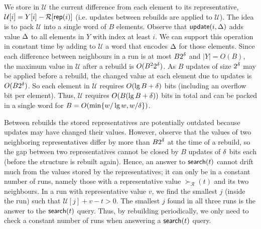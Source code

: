 We store in $\mathcal{U}$ the current difference from each element to its representative, $\mathcal{U}[i] = Y[i] - \mathcal{R}[\mathsf{rep}(i)]$ (i.e. updates between rebuilds are applied to $\mathcal{U}$). The idea is to pack $\mathcal{U}$ into a single word of $B$ elements.
Observe that $\mathsf{update}(i, \Delta)$ adds value $\Delta$ to all elements in $Y$ with index at least $i$. We can support this operation in constant time by adding to $\mathcal{U}$ a word that encodes $\Delta$ for those elements.
Since each difference between neighbours in a run is at most $B 2^\delta$ and $|Y| = O(B)$, the maximum value in $\mathcal{U}$ after a rebuild is $O(B^2 2^\delta)$. As $B$ updates of size $2^\delta$ may be applied before a rebuild, the changed value at each element due to updates is $O(B 2^\delta)$. So each element in $\mathcal{U}$ requires $O(\lg B + \delta)$ bits (including an overflow bit per element). Thus, $\mathcal{U}$ requires $O(B(\lg B + \delta))$ bits in total and can be packed in a single word for $B = O(\min \{w / \lg w, w / \delta \})$.

Between rebuilds the stored representatives are potentially outdated because updates may have changed their values. %
However, observe that the values of two neighboring representatives differ by more than $B 2^\delta$ at the time of a rebuild, so the gap between two representatives cannot be closed by $B$ updates of $\delta$ bits each (before the structure is rebuilt again). 
Hence, an answer to $\mathsf{search}(t)$ cannot drift much from the values stored by the representatives; it can only be in a constant number of runs, namely those with a representative value $\succ_\mathcal{R}(t)$ and its two neighbours. 
In a run with representative value $v$, we find the smallest $j$ (inside the run) such that $\mathcal{U}[j] + v - t > 0$. The smallest $j$ found in all three runs is the answer to the $\mathsf{search}(t)$ query.
Thus, by rebuilding periodically, we only need to check a constant number of runs when answering a $\mathsf{search}(t)$ query.

